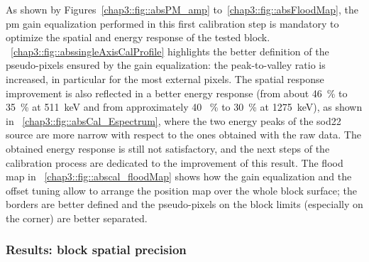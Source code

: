 As shown by Figures~\ref{chap3::fig::absPM_amp} to~\ref{chap3::fig::absFloodMap}, the \gls{pm} gain equalization performed in this first calibration step is mandatory to optimize the spatial and energy response of the tested block. \figurename~\ref{chap3::fig::abssingleAxisCalProfile} highlights the better definition of the pseudo-pixels ensured by the gain equalization: the peak-to-valley ratio is increased, in particular for the most external pixels. The spatial response improvement is also reflected in a better energy response (from about 46~\% to 35~\% at 511~keV and from approximately 40 ~\% to 30~\% at 1275~keV), as shown in \figurename~\ref{chap3::fig::absCal_Espectrum}, where the two energy peaks of the \gls{sod22} source are more narrow with respect to the ones obtained with the raw data. The obtained energy response is still not satisfactory, and the next steps of the calibration process are dedicated to the improvement of this result. The flood map in \figurename~\ref{chap3::fig::abscal_floodMap} shows how the gain equalization and the offset tuning allow to arrange the position map over the whole block surface; the borders are better defined and the pseudo-pixels on the block limits (especially on the corner) are better separated. 

\subsubsection{Results: block spatial precision}\label{chap3::subsubsec::absBlockSpatialAcc}

